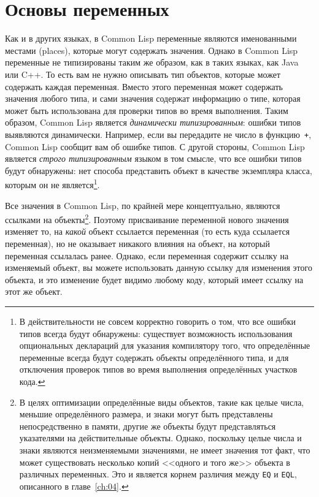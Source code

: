 \section{Основы переменных}

Как и в других языках, в Common Lisp переменные являются именованными мес\-тами (places),
которые могут содержать значения. Однако в Common Lisp переменные не типизированы таким же
образом, как в таких языках, как Java или C++. То есть вам не нужно описывать тип
объектов, которые может содержать каждая переменная. Вместо этого переменная может
содержать значения любого типа, и сами значения содержат информацию о типе, которая может
быть использована для проверки типов во время выполнения. Таким образом, Common Lisp
является \textit{динамически типизированным}: ошибки типов выявляются
динамически. Например, если вы передадите не число в функцию~\lstinline{+}, Common Lisp
сообщит вам об ошибке типов. С другой стороны, Common Lisp является \textit{строго
  типизированным} языком в том смысле, что все ошибки типов будут обнаружены: нет способа
представить объект в качестве экземпляра класса, которым он не является\footnote{В
  действительности не совсем корректно говорить о том, что все ошибки типов всегда будут
  обнаружены: существует возможность использования опциональных деклараций для указания
  компилятору того, что определённые переменные всегда будут содержать объекты
  определённого типа, и для отключения проверок типов во время выполнения определённых
  участков кода.}.

Все значения в Common Lisp, по крайней мере концептуально, являются ссылками на
объекты\footnote{В целях оптимизации определённые виды объектов, такие как целые числа,
  меньшие определённого размера, и знаки могут быть представлены непосредственно в памяти,
  другие же объекты будут представляться указателями на действительные объекты. Однако,
  поскольку целые числа и знаки являются неизменяемыми значениями, не имеет значения тот
  факт, что может существовать несколько копий <<одного и того же>> объекта в различных
  переменных. Это и является корнем различия между \lstinline{EQ} и \lstinline{EQL}, описанного
  в главе~\ref{ch:04}.}. Поэтому присваивание переменной нового значения изменяет то, на
  \textit{какой} объект ссылается переменная (то есть куда ссылается переменная), но не
  оказывает никакого влияния на объект, на который переменная ссылалась ранее. Однако,
  если переменная содержит ссылку на изменяемый объект, вы можете использовать данную
  ссылку для изменения этого объекта, и это изменение будет видимо любому коду, который
  имеет ссылку на этот же объект.


